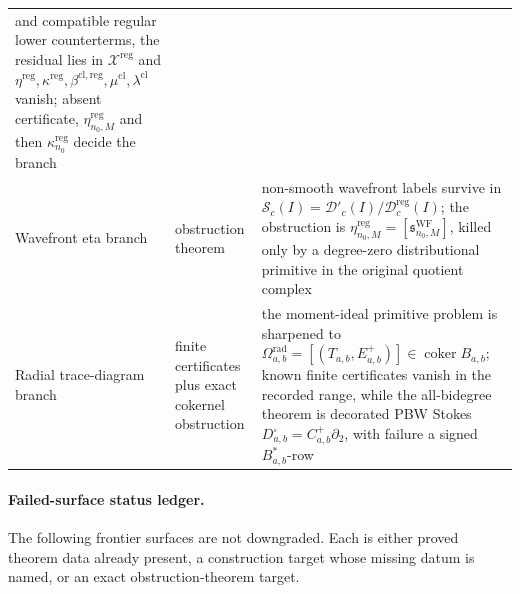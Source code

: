 \begin{center}
\begin{tabular}{p{}p{}p{}}
and compatible regular lower counterterms, the residual lies in
\(\mathcal X^{\mathrm{reg}}\) and
\(\eta^{\mathrm{reg}},\kappa^{\mathrm{reg}},\beta^{\mathrm{cl,reg}},
\mu^{\mathrm{cl}},\lambda^{\mathrm{cl}}\) vanish; absent certificate,
\(\eta^{\mathrm{reg}}_{n_0,M}\) and then
\(\kappa^{\mathrm{reg}}_{n_0}\) decide the branch\\
Wavefront eta branch & obstruction theorem &
non-smooth wavefront labels survive in
\(\mathcal S_c(I)=\mathcal D'_c(I)/\mathcal D^{\mathrm{reg}}_c(I)\);
the obstruction is
\(\eta^{\mathrm{reg}}_{n_0,M}
=[\mathfrak s^{\mathrm{WF}}_{n_0,M}]\), killed only by a degree-zero
distributional primitive in the original quotient complex\\
Radial trace-diagram branch & finite certificates plus exact cokernel
obstruction &
the moment-ideal primitive problem is sharpened to
\(\Omega^{\mathrm{rad}}_{a,b}
=[(T_{a,b},E^+_{a,b})]\in\operatorname{coker}B_{a,b}\);
known finite certificates vanish in the recorded range, while the
all-bidegree theorem is decorated PBW Stokes
\(D^\square_{a,b}=C^+_{a,b}\partial_2\), with failure a signed
\(B^*_{a,b}\)-row\\
\end{tabular}
\end{center}

\medskip
\paragraph{Failed-surface status ledger.}
The following frontier surfaces are not downgraded.  Each is either
proved theorem data already present, a construction target whose missing
datum is named, or an exact obstruction-theorem target.

